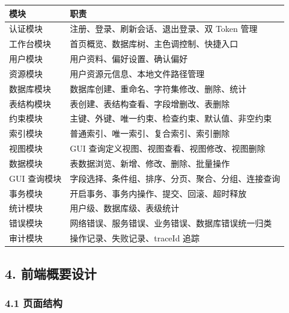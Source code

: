 \documentclass[
  a4paper,
  UTF8]{ctexart}
\begin{document}
\begin{longtable}[]{@{}ll@{}}
\toprule
模块 & 职责 \\
\midrule
\endhead
认证模块 & 注册、登录、刷新会话、退出登录、双 Token 管理 \\
工作台模块 & 首页概览、数据库树、主色调控制、快捷入口 \\
用户模块 & 用户资料、偏好设置、确认偏好 \\
资源模块 & 用户资源元信息、本地文件路径管理 \\
数据库模块 & 数据库创建、重命名、字符集修改、删除、统计 \\
表结构模块 & 表创建、表结构查看、字段增删改、表删除 \\
约束模块 & 主键、外键、唯一约束、检查约束、默认值、非空约束 \\
索引模块 & 普通索引、唯一索引、复合索引、索引删除 \\
视图模块 & GUI 查询定义视图、视图查看、视图修改、视图删除 \\
数据模块 & 表数据浏览、新增、修改、删除、批量操作 \\
GUI 查询模块 & 字段选择、条件组、排序、分页、聚合、分组、连接查询 \\
事务模块 & 开启事务、事务内操作、提交、回滚、超时释放 \\
统计模块 & 用户级、数据库级、表级统计 \\
错误模块 & 网络错误、服务错误、业务错误、数据库错误统一归类 \\
审计模块 & 操作记录、失败记录、traceId 追踪 \\
\bottomrule
\end{longtable}

\hypertarget{ux524dux7aefux6982ux8981ux8bbeux8ba1}{%
\subsection{4.
前端概要设计}\label{ux524dux7aefux6982ux8981ux8bbeux8ba1}}

\hypertarget{ux9875ux9762ux7ed3ux6784}{%
\subsubsection{4.1 页面结构}\label{ux9875ux9762ux7ed3ux6784}}
\end{document}
